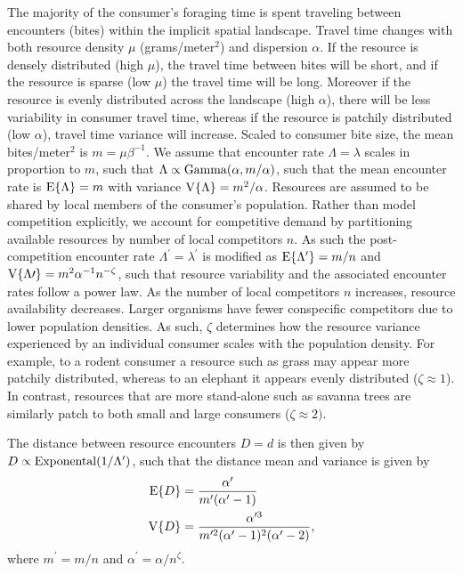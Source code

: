 \documentclass[onecolumn,preprintnumbers,amsmath,amssymb,superscriptaddress]{revtex4}
\begin{document}
The majority of the consumer's foraging time is spent traveling between encounters (bites) within the implicit spatial landscape.
Travel time changes with both resource density $\mu$ (grams/meter${}^2$) and dispersion $\alpha$.
If the resource is densely distributed (high $\mu$), the travel time between bites will be short, and if the resource is sparse (low $\mu$) the travel time will be long.
Moreover if the resource is evenly distributed across the landscape (high $\alpha$), there will be less variability in consumer travel time, whereas if the resource is patchily distributed (low $\alpha$), travel time variance will increase.
Scaled to consumer bite size, the mean bites/meter${}^2$ is $m = \mu \beta^{-1}$.
We assume that encounter rate $\Lambda = \lambda$ scales in proportion to $m$, such that $\Lambda \propto {\rm Gamma}(\alpha, m/\alpha)$, such that the mean encounter rate is ${\rm E}\{\Lambda\} = m$ with variance ${\rm V}\{\Lambda\}=m^2/\alpha$.
Resources are assumed to be shared by local members of the consumer's population.
Rather than model competition explicitly, we account for competitive demand by partitioning available resources by number of local competitors $n$.
As such the post-competition encounter rate $\Lambda^\prime = \lambda^\prime$ is modified as ${\rm E}\{\Lambda^\prime\}= m/n$ and ${\rm V}\{\Lambda\prime\}=m^2 \alpha^{-1} n^{-\zeta}$, such that resource variability and the associated encounter rates follow a power law.
As the number of local competitors $n$ increases, resource availability decreases. 
Larger organisms have fewer conspecific competitors due to lower population densities. 
As such, $\zeta$ determines how the resource variance experienced by an individual consumer scales with the population density.
For example, to a rodent consumer a resource such as grass may appear more patchily distributed, whereas to an elephant it appears evenly distributed ($\zeta \approx 1$).
In contrast, resources that are more stand-alone such as savanna trees are similarly patch to both small and large consumers ($\zeta \approx 2)$.


The distance between resource encounters $D=d$ is then given by $D \propto {\rm Exponental}(1/\Lambda^{\prime})$, such that the distance mean and variance is given by
\begin{align}
    {\rm E}\{D\} &= \frac{\alpha^\prime}{m^\prime(\alpha^\prime - 1)} \nonumber \\
    {\rm V}\{D\} &= \frac{\alpha^{\prime 3}}{m^{\prime 2}(\alpha^\prime - 1)^2(\alpha^\prime -2)},
\end{align}
where $m^\prime = m/n$ and $\alpha^\prime = \alpha/n^\zeta$.
\end{document}

